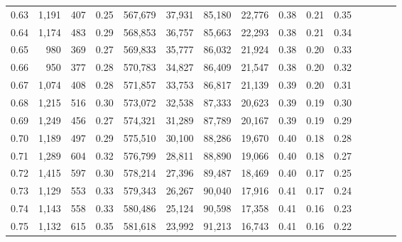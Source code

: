 \begin{tabular}{rrrcrrrrrrrrrrr}
0.63 &   1,191 &    407 &                                       0.25 &  567,679 &   37,931 &   85,180 &   22,776 &  0.38 &  0.21 &                         0.35 \\
0.64 &   1,174 &    483 &                                       0.29 &  568,853 &   36,757 &   85,663 &   22,293 &  0.38 &  0.21 &                         0.34 \\
0.65 &     980 &    369 &                                       0.27 &  569,833 &   35,777 &   86,032 &   21,924 &  0.38 &  0.20 &                         0.33 \\
0.66 &     950 &    377 &                                       0.28 &  570,783 &   34,827 &   86,409 &   21,547 &  0.38 &  0.20 &                         0.32 \\
0.67 &   1,074 &    408 &                                       0.28 &  571,857 &   33,753 &   86,817 &   21,139 &  0.39 &  0.20 &                         0.31 \\
0.68 &   1,215 &    516 &                                       0.30 &  573,072 &   32,538 &   87,333 &   20,623 &  0.39 &  0.19 &                         0.30 \\
0.69 &   1,249 &    456 &                                       0.27 &  574,321 &   31,289 &   87,789 &   20,167 &  0.39 &  0.19 &                         0.29 \\
0.70 &   1,189 &    497 &                                       0.29 &  575,510 &   30,100 &   88,286 &   19,670 &  0.40 &  0.18 &                         0.28 \\
0.71 &   1,289 &    604 &                                       0.32 &  576,799 &   28,811 &   88,890 &   19,066 &  0.40 &  0.18 &                         0.27 \\
0.72 &   1,415 &    597 &                                       0.30 &  578,214 &   27,396 &   89,487 &   18,469 &  0.40 &  0.17 &                         0.25 \\
0.73 &   1,129 &    553 &                                       0.33 &  579,343 &   26,267 &   90,040 &   17,916 &  0.41 &  0.17 &                         0.24 \\
0.74 &   1,143 &    558 &                                       0.33 &  580,486 &   25,124 &   90,598 &   17,358 &  0.41 &  0.16 &                         0.23 \\
0.75 &   1,132 &    615 &                                       0.35 &  581,618 &   23,992 &   91,213 &   16,743 &  0.41 &  0.16 &                         0.22 \\

\end{tabular}
